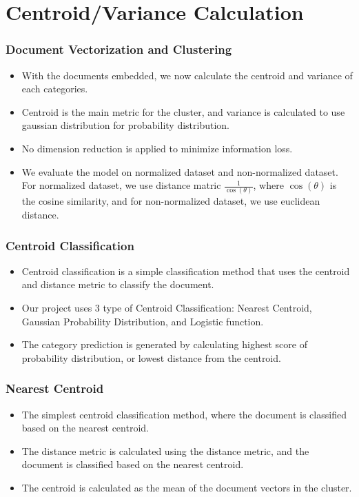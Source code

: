 \documentclass[
    10pt %
    16:9, %
]{beamer}
\begin{document}
\section{Centroid/Variance Calculation}
\begin{frame}
  \frametitle{Document Vectorization and Clustering}
  \begin{itemize}
    \item With the documents embedded, we now calculate the centroid and variance of each categories.
    \item Centroid is the main metric for the cluster, and variance is calculated to use gaussian distribution for probability distribution.
    \item No dimension reduction is applied to minimize information loss.
    \item We evaluate the model on normalized dataset and non-normalized dataset. For normalized dataset, we use distance matric $\frac{1}{\cos(\theta)}$, where $\cos(\theta)$ is the cosine similarity, and for non-normalized dataset, we use euclidean distance.
  \end{itemize}
\end{frame}

\begin{frame}
  \frametitle{Centroid Classification}
  \begin{itemize}
    \item Centroid classification is a simple classification method that uses the centroid and distance metric to classify the document.
    \item Our project uses 3 type of Centroid Classification: Nearest Centroid, Gaussian Probability Distribution, and Logistic function.
    \item The category prediction is generated by calculating highest score of probability distribution, or lowest distance from the centroid.
  \end{itemize}
\end{frame}

\begin{frame}
  \frametitle{Nearest Centroid}
  \begin{itemize}
    \item The simplest centroid classification method, where the document is classified based on the nearest centroid.
    \item The distance metric is calculated using the distance metric, and the document is classified based on the nearest centroid.
    \item The centroid is calculated as the mean of the document vectors in the cluster.
  \end{itemize}
\end{frame}
\end{document}
